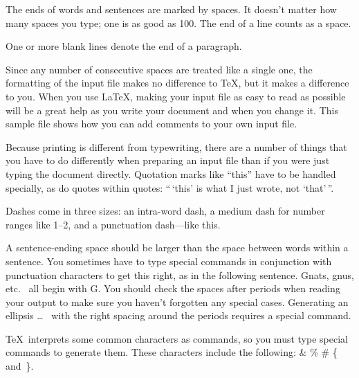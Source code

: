 \documentclass[ss]{imsart}
\numberwithin{equation}{section}
\theoremstyle{plain}
\begin{document}
The ends  of words and sentences are marked
  by   spaces. It  doesn't matter how many
spaces    you type; one is as good as 100.  The
end of   a line counts as a space.

One   or more   blank lines denote the  end
of  a paragraph.

Since any number of consecutive spaces are treated like a single
one, the formatting of the input file makes no difference to
      \TeX,         %
but it makes a difference to you.
When you use
      \LaTeX,       %
making your input file as easy to read as possible
will be a great help as you write your document and when you
change it.  This sample file shows how you can add comments to
your own input file.

Because printing is different from typewriting, there are a
number of things that you have to do differently when preparing
an input file than if you were just typing the document directly.
Quotation marks like
       ``this''
have to be handled specially, as do quotes within quotes:
       ``\,`this'                  %
    is what I just
    wrote, not  `that'\,''.

Dashes come in three sizes: an
       intra-word
dash, a medium dash for number ranges like
       1--2,
and a punctuation
       dash---like
this.

A sentence-ending space should be larger than the space between words
within a sentence.  You sometimes have to type special commands in
conjunction with punctuation characters to get this right, as in the
following sentence.
       Gnats, gnus, etc.\    %
       all begin with G\@.   %
You should check the spaces after periods when reading your output to
make sure you haven't forgotten any special cases.
Generating an ellipsis
       \ldots\    %
with the right spacing around the periods
requires a special  command.

\TeX\ interprets some common characters as commands, so you must type
special commands to generate them.  These characters include the
following:
       \& \% \# \{ and~\}.
\end{document}
